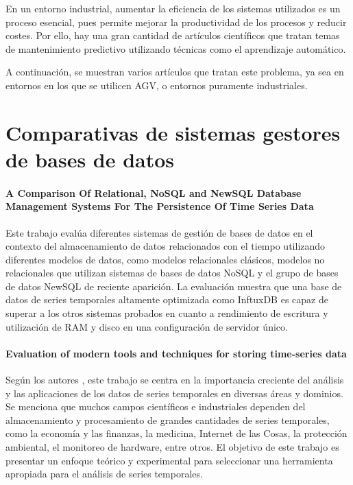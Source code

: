 
En un entorno industrial, aumentar la eficiencia de los sistemas utilizados es un proceso esencial, pues permite 
mejorar la productividad de los procesos y reducir costes. Por ello, hay una gran cantidad de artículos científicos 
que tratan temas de mantenimiento predictivo utilizando técnicas como el aprendizaje automático.

A continuación, se muestran varios artículos que tratan este problema, ya sea en entornos en los que se utilicen
AGV, o entornos puramente industriales.

\section{Comparativas de sistemas gestores de bases de datos}

\paragraph{A Comparison Of Relational, NoSQL and NewSQL Database Management Systems For The Persistence Of Time Series Data}

Este trabajo \cite{9988333} evalúa diferentes sistemas de gestión de bases de datos en el contexto del almacenamiento de 
datos relacionados con el tiempo utilizando diferentes modelos de datos, como modelos relacionales clásicos, modelos no 
relacionales que utilizan sistemas de bases de datos NoSQL y el grupo de bases de datos NewSQL de reciente aparición. 
La evaluación muestra que una base de datos de series temporales altamente optimizada como InftuxDB es capaz de superar 
a los otros sistemas probados en cuanto a rendimiento de escritura y utilización de RAM y disco en una configuración de 
servidor único.

\paragraph{Evaluation of modern tools and techniques for storing time-series data}

Según los autores \cite{STRUCKOV201919}, este trabajo se centra en la importancia creciente del análisis y las aplicaciones 
de los datos de series temporales en diversas áreas y dominios. Se menciona que muchos campos científicos e industriales 
dependen del almacenamiento y procesamiento de grandes cantidades de series temporales, como la economía y las finanzas, 
la medicina, Internet de las Cosas, la protección ambiental, el monitoreo de hardware, entre otros. El objetivo de este 
trabajo es presentar un enfoque teórico y experimental para seleccionar una herramienta apropiada para el análisis de 
series temporales.


